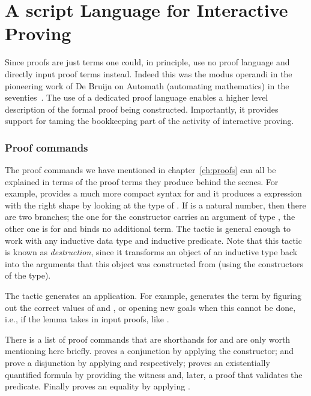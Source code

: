 \chapter{A script Language for Interactive Proving}{}



Since proofs are just terms one could,
in principle, use no proof language and directly input proof terms instead.
Indeed this was the modus operandi in the pioneering work of
De Bruijn on Automath (automating mathematics) in the seventies~\cite{nederpelt-94}.
The use of a dedicated proof language enables a higher level
description of the formal proof being constructed. Importantly, it
provides support for taming the bookkeeping part of the activity of
interactive proving.

\subsection{Proof commands}
  The proof commands we have mentioned in chapter~\ref{ch:proofs} can all be
explained in terms of the proof terms they produce behind the scenes.
For example,  provides a much more compact syntax
for  and it produces a
 expression with the right
shape by looking at the type of .  If  is a natural number, then there
are two branches; the one for the  constructor carries an argument of type
, the other one is for  and binds no additional term.
The  tactic is general enough to work with any inductive data type
and inductive predicate. Note that this tactic is known as
\emph{destruction}, since it transforms an object of an inductive type
back into the arguments that this object was constructed from (using
the constructors of the type).

The  tactic generates an application.  For example, 
generates the term  by figuring out the correct values of
 and , or opening new goals when this cannot be done, i.e.,
if the lemma takes in input proofs, like .

There is a list of proof commands that are shorthands for 
and are only worth mentioning here briefly.  proves a conjunction
by applying the  constructor;  and  prove a
disjunction by applying  and  respectively;
 proves an existentially quantified formula by providing
the witness  and, later, a proof that  validates the predicate.
Finally  proves an equality by applying .

